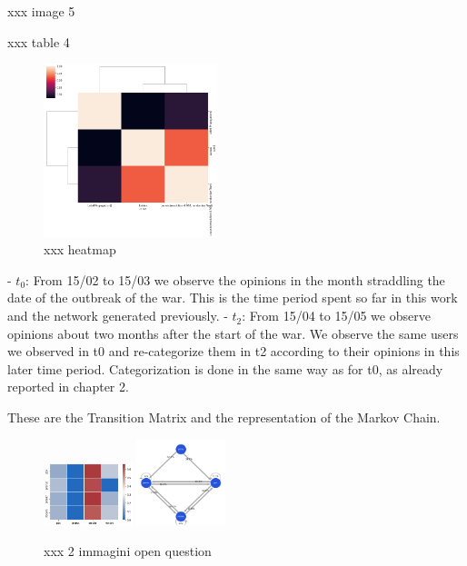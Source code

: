 \documentclass[sigchi]{acmart}
\begin{document}
xxx image 5


xxx table 4






\begin{figure}[h]
\caption{xxx heatmap}
\centering
\includegraphics[width=0.45\textwidth]{static_community_discovery}
\end{figure}



- $t_0$: From 15/02 to 15/03 we observe the opinions in the month straddling the date of the outbreak of the war. This is the time period spent so far in this work and the network generated previously.
- $t_2$: From 15/04 to 15/05 we observe opinions about two months after the start of the war. We observe the same users we observed in t0 and re-categorize them in t2 according to their opinions in this later time period. Categorization is done in the same way as for t0, as already reported in chapter 2.

These are the Transition Matrix and the representation of the Markov Chain.

\begin{figure}[h]
\caption{xxx 2 immagini open question}
\centering
\includegraphics[width=0.23\textwidth]{open_question_1}
\includegraphics[width=0.23\textwidth]{open_question_2}
\end{figure}
\end{document}
